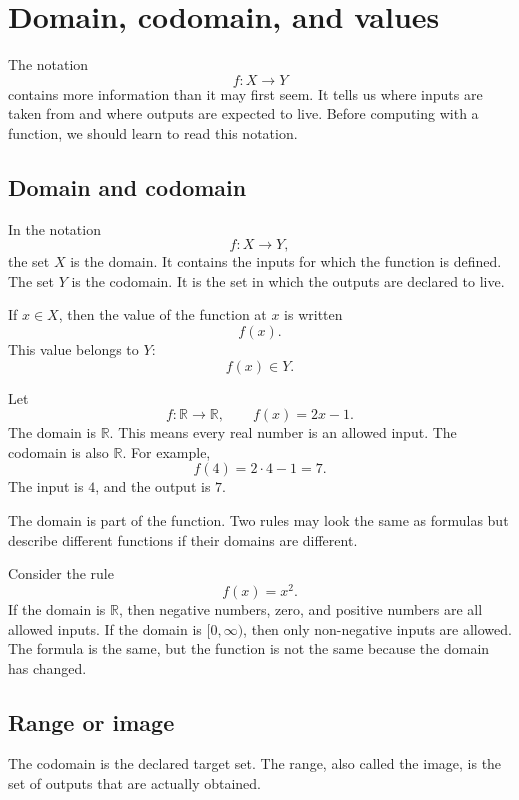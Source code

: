 \section{Domain, codomain, and values}

The notation
\[
f:X\to Y
\]
contains more information than it may first seem. It tells us where inputs are taken from and where outputs are expected to live. Before computing with a function, we should learn to read this notation.

\subsection*{Domain and codomain}

In the notation
\[
f:X\to Y,
\]
the set \(X\) is the domain. It contains the inputs for which the function is defined. The set \(Y\) is the codomain. It is the set in which the outputs are declared to live.

If \(x\in X\), then the value of the function at \(x\) is written
\[
f(x).
\]
This value belongs to \(Y\):
\[
f(x)\in Y.
\]

\begin{examplebox}
Let
\[
f:\mathbb{R}\to\mathbb{R},
\qquad
f(x)=2x-1.
\]
The domain is \(\mathbb{R}\). This means every real number is an allowed input. The codomain is also \(\mathbb{R}\). For example,
\[
f(4)=2\cdot4-1=7.
\]
The input is \(4\), and the output is \(7\).
\end{examplebox}

The domain is part of the function. Two rules may look the same as formulas but describe different functions if their domains are different.

\begin{examplebox}
Consider the rule
\[
f(x)=x^2.
\]
If the domain is \(\mathbb{R}\), then negative numbers, zero, and positive numbers are all allowed inputs. If the domain is \([0,\infty)\), then only non-negative inputs are allowed. The formula is the same, but the function is not the same because the domain has changed.
\end{examplebox}

\subsection*{Range or image}

The codomain is the declared target set. The range, also called the image, is the set of outputs that are actually obtained.

